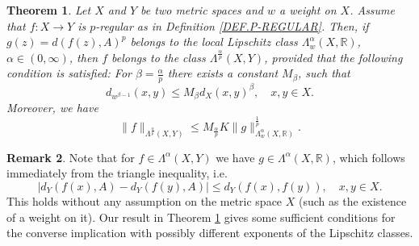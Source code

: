 \documentclass{amsart}
\newtheorem{theorem}{Theorem}[section]
\theoremstyle{definition}
\newtheorem{remark}[theorem]{Remark}
\numberwithin{equation}{section}
\begin{document}
\begin{theorem}\label{TH.MAIN}
Let $X$ and $Y$ be two metric spaces and $w$ a weight on $X$. Assume that $f:X\to Y$ is $p$-regular as in
Definition \ref{DEF.P-REGULAR}. Then, if $g(z) = d ( f(z), A )^p$ belongs to the local Lipschitz class
$\Lambda^\alpha_{w} (X,\mathbb {R})$, $\alpha \in (0,\infty)$, then $f$ belongs to the class
$\Lambda^{\frac\alpha p} (X,Y)$, provided that the following condition is satisfied: For $\beta = \frac {\alpha}p$ there
exists a constant  $M_\beta$, such  that
\begin{equation*}
d_{w^{\beta-1}} (x,y)\le M_\beta d_X (x,y)^\beta,\quad x,y\in X.
\end{equation*}
Moreover, we have
\begin{equation*}
\|f\| _{\Lambda^{\frac \alpha p} (X,Y)}\le M_{\frac \alpha p}K \|g\| _{\Lambda^\alpha_{w} (X,\mathbb {R} )} ^\frac 1p.
\end{equation*}
\end{theorem}

\begin{remark}
Note that for $f\in \Lambda^\alpha (X,Y)$ we have $g\in \Lambda^\alpha (X,\mathbb {R})$, which follows immediately from
the triangle inequality, i.e.
\begin{equation*}
|d_Y(f(x),A) - d_Y(f(y),A) |\le d_Y(f(x), f(y)), \quad x,y\in X.
\end{equation*}
This holds without any assumption on the metric space $X$ (such as the existence of a weight on it). Our result in
Theorem \ref{TH.MAIN} gives some sufficient conditions for the converse implication with possibly different exponents of
the Lipschitz classes.
\end{remark}
\end{document}
